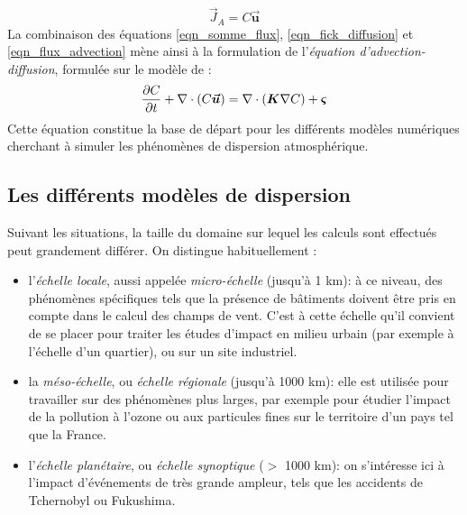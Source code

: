 	\begin{equation}
	\label{eqn_flux_advection}
	\vec{J}_A = C\bm{\vec{u}}
	\end{equation}
	La combinaison des équations \eqref{eqn_somme_flux}, \eqref{eqn_fick_diffusion} et \eqref{eqn_flux_advection} mène ainsi à la formulation de l'\textit{équation d'advection-diffusion}, formulée sur le modèle de \cite{Stockie2011}:\\
	
	\begin{equation}
		\label{eqn_advection_diffusion}
		\dfrac{\partial C}{\partial t} + \nabla \cdot(C\bm{\vec{u}}) = \nabla \cdot (\bm{K}\nabla C) + {\bm{\varsigma}}
	\end{equation}
	Cette équation constitue la base de départ pour les différents modèles numériques cherchant à simuler les phénomènes de dispersion atmosphérique.\\
	
	\subsection{Les différents modèles de dispersion}
	
	Suivant les situations, la taille du domaine sur lequel les calculs sont effectués peut grandement différer. On distingue habituellement : \\
	\begin{itemize}
		\item l'\textit{échelle locale}, aussi appelée \textit{micro-échelle} (jusqu'à 1 km): à ce niveau, des phénomènes spécifiques tels que la présence de bâtiments doivent être pris en compte dans le calcul des champs de vent. C'est à cette échelle qu'il convient de se placer pour traiter les études d'impact en milieu urbain (par exemple à l'échelle d'un quartier), ou sur un site industriel. 
		\item la \textit{méso-échelle}, ou \textit{échelle régionale} (jusqu'à 1000 km): elle est utilisée pour travailler sur des phénomènes plus larges, par exemple pour étudier l'impact de la pollution à l'ozone ou aux particules fines sur le territoire d'un pays tel que la France. 
		\item l'\textit{échelle planétaire}, ou \textit{échelle synoptique} ($>$ 1000 km): on s'intéresse ici à l'impact d'événements de très grande ampleur, tels que les {accidents} de Tchernobyl ou Fukushima. \\
		
	\end{itemize}
	
